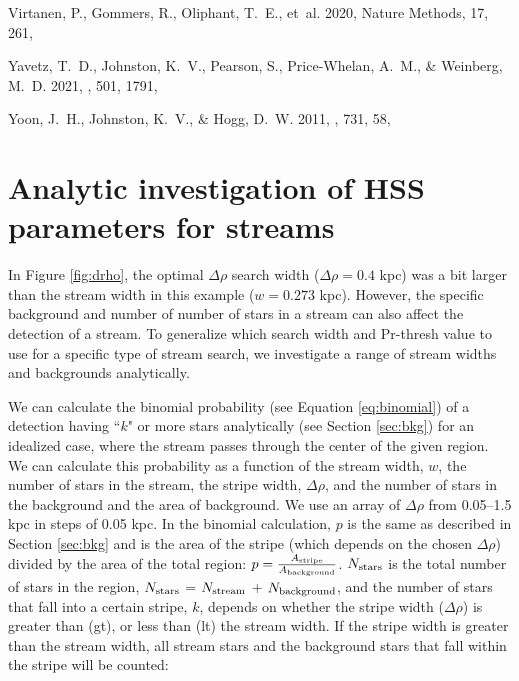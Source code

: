 \documentclass[twocolumn]{aastex631}
\begin{document}
\begin{thebibliography}{}
{Virtanen}, P., {Gommers}, R., {Oliphant}, T.~E., {et~al.} 2020, Nature
  Methods, 17, 261, 

{Yavetz}, T.~D., {Johnston}, K.~V., {Pearson}, S., {Price-Whelan}, A.~M., \&
  {Weinberg}, M.~D. 2021, \mnras, 501, 1791, 

{Yoon}, J.~H., {Johnston}, K.~V., \& {Hogg}, D.~W. 2011, \apj, 731, 58,

\end{thebibliography}

% 

\appendix
\section{Analytic investigation of HSS parameters for streams}\label{sec:analytic}
In Figure \ref{fig:drho}, the optimal $\Delta \rho$ search width ($\Delta \rho = 0.4$ kpc)  was a bit larger than the stream width in this example ($w = 0.273$ kpc). However, the specific background and number of number of stars in a stream can also affect the detection of a stream. To generalize which search width and Pr-thresh value to use for a specific type of stream search, we investigate a range of stream widths and backgrounds analytically.

We can calculate the binomial probability (see Equation \ref{eq:binomial}) of a detection having ``$k$" or more stars analytically (see Section \ref{sec:bkg}) for an idealized case, where the stream passes through the center of the given region. We can calculate this probability as a function of the stream width, $w$, the number of stars in the stream, the stripe width, $\Delta \rho$, and the number of stars in the background and the area of background. We use an array of $\Delta \rho$ from 0.05--1.5 kpc in steps of 0.05 kpc. In the binomial calculation, $p$ is the same as described in Section \ref{sec:bkg} and is the area of the stripe (which depends on the chosen $\Delta \rho$) divided by the area of the total region: $p = \frac{A_{\rm stripe}}{A_{\rm background}}$. $N_{\rm stars}$ is the total number of stars in the region, $N_{\rm stars}$ = $N_{\rm stream}$ + $N_{\rm background}$, and the number of stars that fall into a certain stripe, $k$, depends on whether the stripe width ($\Delta \rho$) is greater than (gt), or less than (lt) the stream width. If the stripe width is greater than the stream width, all stream stars and the background stars that fall within the stripe will be counted:
\end{document}
